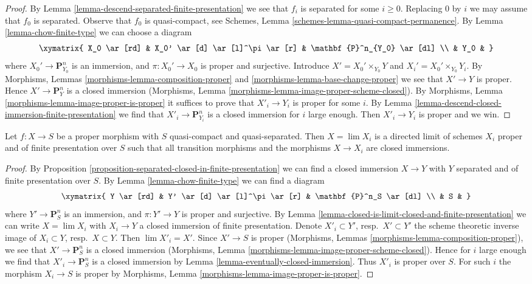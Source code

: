 \begin{proof}
By Lemma \ref{lemma-descend-separated-finite-presentation} we see that
$f_i$ is separated for some $i \geq 0$. Replacing
$0$ by $i$ we may assume that $f_0$ is separated.
Observe that $f_0$ is quasi-compact, see
Schemes, Lemma \ref{schemes-lemma-quasi-compact-permanence}.
By Lemma \ref{lemma-chow-finite-type} we can choose a diagram
$$
\xymatrix{
X_0 \ar[rd] & X_0' \ar[d] \ar[l]^\pi \ar[r] & \mathbf{P}^n_{Y_0} \ar[dl] \\
& Y_0 &
}
$$
where $X_0' \to \mathbf{P}^n_{Y_0}$ is an immersion, and
$\pi : X_0' \to X_0$ is proper and surjective. Introduce
$X' = X_0' \times_{Y_0} Y$ and $X_i' = X_0' \times_{Y_0} Y_i$.
By Morphisms, Lemmas \ref{morphisms-lemma-composition-proper} and
\ref{morphisms-lemma-base-change-proper}
we see that $X' \to Y$ is proper. Hence $X' \to \mathbf{P}^n_Y$ is
a closed immersion (Morphisms, Lemma
\ref{morphisms-lemma-image-proper-scheme-closed}). By
Morphisms, Lemma \ref{morphisms-lemma-image-proper-is-proper}
it suffices to prove that $X'_i \to Y_i$ is proper for some $i$.
By Lemma \ref{lemma-descend-closed-immersion-finite-presentation}
we find that $X'_i \to \mathbf{P}^n_{Y_i}$ is
a closed immersion for $i$ large enough. Then $X'_i \to Y_i$
is proper and we win.
\end{proof}

\begin{lemma}
\label{lemma-proper-limit-of-proper-finite-presentation}
Let $f : X \to S$ be a proper morphism with $S$ quasi-compact and
quasi-separated. Then $X = \lim X_i$ is a directed limit of schemes
$X_i$ proper and of finite presentation over $S$ such that
all transition morphisms and the morphisms $X \to X_i$ are closed
immersions.
\end{lemma}

\begin{proof}
By Proposition \ref{proposition-separated-closed-in-finite-presentation}
we can find a closed immersion $X \to Y$ with $Y$ separated and of
finite presentation over $S$. By Lemma \ref{lemma-chow-finite-type}
we can find a diagram
$$
\xymatrix{
Y \ar[rd] & Y' \ar[d] \ar[l]^\pi \ar[r] & \mathbf{P}^n_S \ar[dl] \\
& S &
}
$$
where $Y' \to \mathbf{P}^n_S$ is an immersion, and
$\pi : Y' \to Y$ is proper and surjective. By
Lemma \ref{lemma-closed-is-limit-closed-and-finite-presentation}
we can write $X = \lim X_i$ with $X_i \to Y$ a closed immersion of
finite presentation. Denote $X'_i \subset Y'$, resp.\ $X' \subset Y'$
the scheme theoretic inverse image of $X_i \subset Y$, resp.\ $X \subset Y$.
Then $\lim X'_i = X'$. Since $X' \to S$ is proper
(Morphisms, Lemmas \ref{morphisms-lemma-composition-proper}), we see that
$X' \to \mathbf{P}^n_S$ is a closed immersion (Morphisms, Lemma
\ref{morphisms-lemma-image-proper-scheme-closed}). Hence for $i$ large enough
we find that $X'_i \to \mathbf{P}^n_S$ is a closed immersion by
Lemma \ref{lemma-eventually-closed-immersion}.
Thus $X'_i$ is proper over $S$.
For such $i$ the morphism $X_i \to S$ is proper by
Morphisms, Lemma \ref{morphisms-lemma-image-proper-is-proper}.
\end{proof}

